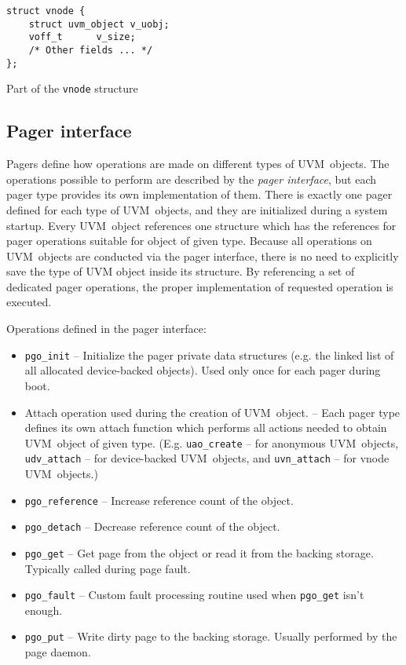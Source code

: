\begin{listing}[h]
  \begin{verbatim}
struct vnode {
    struct uvm_object v_uobj;
    voff_t      v_size;
    /* Other fields ... */
};
  \end{verbatim}
  \caption{Part of the \texttt{vnode} structure}
  \label{code:vnode}
\end{listing}

\subsection{Pager interface}

Pagers define how operations are made on different types of UVM~objects.
The operations possible to perform are described by the {\it pager interface}, but each pager type provides its own implementation of them.
There is exactly one pager defined for each type of UVM~objects, and they are initialized during a system startup.
Every UVM~object references one structure which has the references for pager operations suitable for object of given type.
Because all operations on UVM~objects are conducted via the pager interface, there is no need to explicitly save the type of UVM object inside its structure.
By referencing a set of dedicated pager operations, the proper implementation of requested operation is executed.

Operations defined in the pager interface:
\begin{itemize}
  \item \texttt{pgo_init}
    -- Initialize the pager private data structures (e.g. the linked list of all allocated device-backed objects).
       Used only once for each pager during boot.

  \item Attach operation used during the creation of UVM~object.
    -- Each pager type defines its own attach function which performs all actions needed to obtain UVM~object of given type.
       (E.g. \texttt{uao_create} -- for anonymous UVM~objects,
             \texttt{udv_attach} -- for device-backed UVM~objects, and
             \texttt{uvn_attach} -- for vnode UVM~objects.)

  \item \texttt{pgo_reference}
    -- Increase reference count of the object.

  \item \texttt{pgo_detach}
    -- Decrease reference count of the object.

  \item \texttt{pgo_get}
    -- Get page from the object or read it from the backing storage.
       Typically called during page fault.

  \item \texttt{pgo_fault}
    -- Custom fault processing routine used when \texttt{pgo_get} isn't enough.

  \item \texttt{pgo_put}
    -- Write dirty page to the backing storage.
       Usually performed by the page daemon.

\end{itemize}

